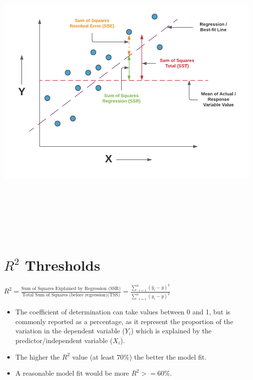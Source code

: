 \documentclass[
]{article}
\providecommand{\tightlist}{%
  \setlength{\itemsep}{0pt}\setlength{\parskip}{0pt}}
\begin{document}
\includegraphics[width=6.04167in,height=6.14583in]{images/regression_terminologies.png}

\hypertarget{r2-thresholds}{%
\section{\texorpdfstring{\(R^{2}\)
Thresholds}{R\^{}\{2\} Thresholds}}\label{r2-thresholds}}

\(R^2 = \frac{\text{Sum of Squares Explained by Regression (SSR)}}{\text{Total Sum of Squares (before regression)(TSS)}} = \frac{\underset{i=1}{\stackrel{n}{\sum}}(\hat{y}_{i} - \overline{y})^2}{\underset{i=1}{\stackrel{n}{\sum}}(y_{i} - \overline{y})^{2}}\)

\begin{itemize}
\tightlist
\item
  The coefficient of determination can take values between 0 and 1, but
  is commonly reported as a percentage, as it represent the proportion
  of the variation in the dependent variable (\(Y_{i}\)) which is
  explained by the predictor/independent variable (\(X_{i}\)).
\item
  The higher the \(R^{2}\) value (at least \(70\%\)) the better the
  model fit.
\item
  A reasonable model fit would be more \(R^{2} >= 60\%\).
\end{itemize}
\end{document}

